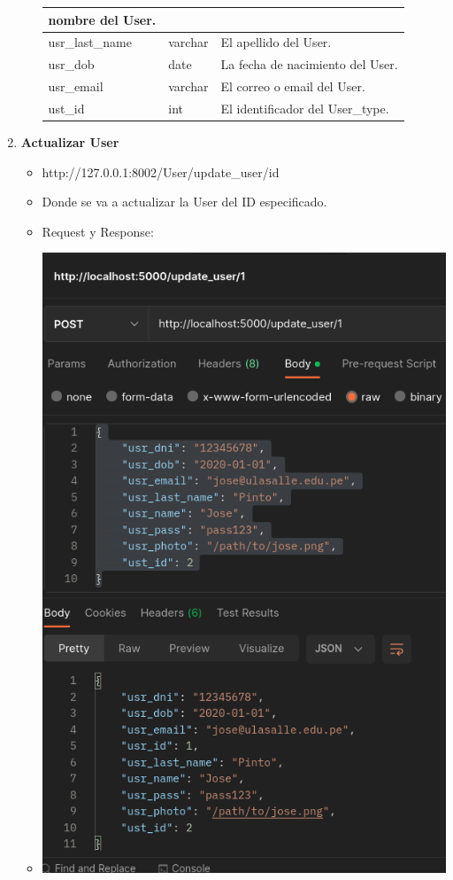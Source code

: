 \documentclass{article}
\begin{document}
\begin{enumerate}
\begin{itemize}
\begin{table}[H]
\begin{tabular}{|l|l|l|}
        nombre del User. \\ \hline usr\_last\_name & varchar & El apellido del
        User. \\ \hline usr\_dob & date & La fecha de nacimiento del User. \\
        \hline usr\_email & varchar & El correo o email del User. \\ \hline
        ust\_id & int & El identificador del User\_type. \\ \hline \end{tabular}
        \end{table}
    \end{itemize}

    \item \textbf{Actualizar User}
    \begin{itemize}
        \item http://127.0.0.1:8002/User/update\_user/id
        \item Donde se va a actualizar la User del ID especificado.
        \item Request y Response:
        \item \includegraphics[scale=.5]{assets/user/update_user.png}

\end{itemize}
\end{enumerate}
\end{document}
